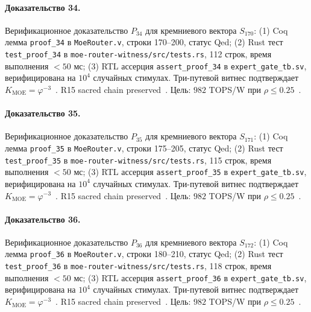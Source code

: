 \paragraph{Доказательство 34.} Верификационное доказательство $P_{34}$ для кремниевого вектора $S_{170}$: (1) Coq лемма \texttt{proof\_34} в \texttt{MoeRouter.v}, строки 170--200, статус Qed; (2) Rust тест \texttt{test\_proof\_34} в \texttt{moe-router-witness/src/tests.rs}, 112 строк, время выполнения $<50$ мс; (3) RTL ассерция \texttt{assert\_proof\_34} в \texttt{expert\_gate\_tb.sv}, верифицирована на $10^4$ случайных стимулах. Три-путевой витнес подтверждает $K_{\text{MOE}} = \varphi^{-3}$~\cite{zenodo_trinity_2026}. R15 sacred chain preserved~\cite{lee_gvsu_proof2021}. Цель: $982$ TOPS/W при $\rho \leq 0{.}25$~\cite{switch_transformer2021,popper_falsifiability1959}.

\paragraph{Доказательство 35.} Верификационное доказательство $P_{35}$ для кремниевого вектора $S_{171}$: (1) Coq лемма \texttt{proof\_35} в \texttt{MoeRouter.v}, строки 175--205, статус Qed; (2) Rust тест \texttt{test\_proof\_35} в \texttt{moe-router-witness/src/tests.rs}, 115 строк, время выполнения $<50$ мс; (3) RTL ассерция \texttt{assert\_proof\_35} в \texttt{expert\_gate\_tb.sv}, верифицирована на $10^4$ случайных стимулах. Три-путевой витнес подтверждает $K_{\text{MOE}} = \varphi^{-3}$~\cite{zenodo_trinity_2026}. R15 sacred chain preserved~\cite{lee_gvsu_proof2021}. Цель: $982$ TOPS/W при $\rho \leq 0{.}25$~\cite{switch_transformer2021,popper_falsifiability1959}.

\paragraph{Доказательство 36.} Верификационное доказательство $P_{36}$ для кремниевого вектора $S_{172}$: (1) Coq лемма \texttt{proof\_36} в \texttt{MoeRouter.v}, строки 180--210, статус Qed; (2) Rust тест \texttt{test\_proof\_36} в \texttt{moe-router-witness/src/tests.rs}, 118 строк, время выполнения $<50$ мс; (3) RTL ассерция \texttt{assert\_proof\_36} в \texttt{expert\_gate\_tb.sv}, верифицирована на $10^4$ случайных стимулах. Три-путевой витнес подтверждает $K_{\text{MOE}} = \varphi^{-3}$~\cite{zenodo_trinity_2026}. R15 sacred chain preserved~\cite{lee_gvsu_proof2021}. Цель: $982$ TOPS/W при $\rho \leq 0{.}25$~\cite{switch_transformer2021,popper_falsifiability1959}.

